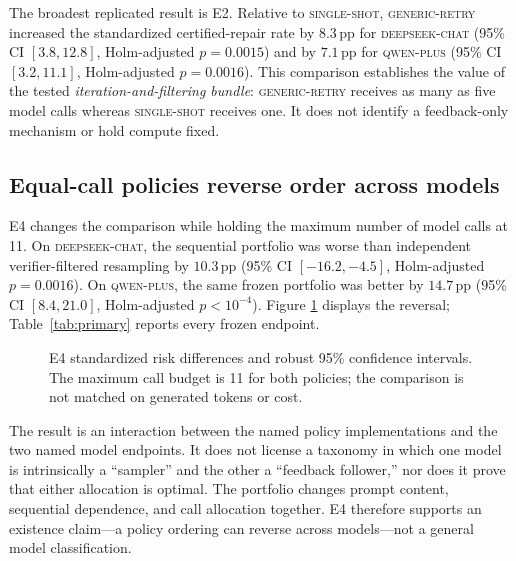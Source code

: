 \documentclass[11pt]{scrartcl}
\newcommand{\dscode}{\textsc{deepseek-chat}}
\newcommand{\qwcode}{\textsc{qwen-plus}}
\newcommand{\ssarm}{\textsc{single-shot}}
\newcommand{\grarm}{\textsc{generic-retry}}
\newcommand{\pp}{\,\mathrm{pp}}
\begin{document}
The broadest replicated result is E2.  Relative to \ssarm{}, \grarm{} increased
the standardized certified-repair rate by $8.3\pp$ for \dscode{} (95\% CI
$[3.8,12.8]$, Holm-adjusted $p=0.0015$) and by $7.1\pp$ for \qwcode{} (95\%
CI $[3.2,11.1]$, Holm-adjusted $p=0.0016$).  This comparison establishes the
value of the tested \emph{iteration-and-filtering bundle}: \grarm{} receives as
many as five model calls whereas \ssarm{} receives one.  It does not identify a
feedback-only mechanism or hold compute fixed.

\subsection{Equal-call policies reverse order across models}

E4 changes the comparison while holding the maximum number of model calls at
11.  On \dscode{}, the sequential portfolio was worse than independent
verifier-filtered resampling by $10.3\pp$ (95\% CI $[-16.2,-4.5]$,
Holm-adjusted $p=0.0016$).  On \qwcode{}, the same frozen portfolio was better
by $14.7\pp$ (95\% CI $[8.4,21.0]$, Holm-adjusted $p<10^{-4}$).  Figure
\ref{fig:e4} displays the reversal; Table~\ref{tab:primary} reports every frozen
endpoint.

\begin{figure}[t]
\centering
{}
\caption{E4 standardized risk differences and robust 95\% confidence
intervals.  The maximum call budget is 11 for both policies; the comparison is
not matched on generated tokens or cost.}
\label{fig:e4}
\end{figure}

The result is an interaction between the named policy implementations and the
two named model endpoints.  It does not license a taxonomy in which one model
is intrinsically a ``sampler'' and the other a ``feedback follower,'' nor does
it prove that either allocation is optimal.  The portfolio changes prompt
content, sequential dependence, and call allocation together.  E4 therefore
supports an existence claim---a policy ordering can reverse across models---not
a general model classification.
\end{document}
